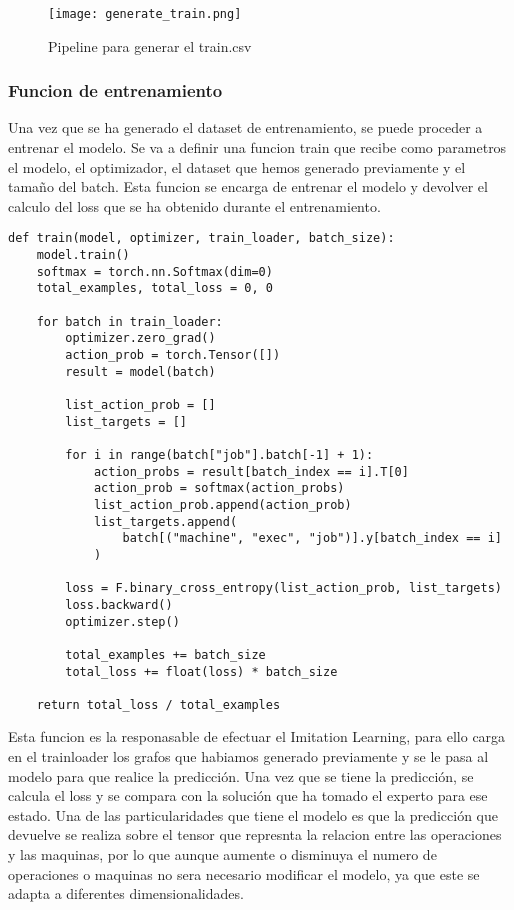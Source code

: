\begin{figure}[ht]
    \centering
    \texttt{[image: generate\_train.png]}
    \caption{Pipeline para generar el train.csv}
    \label{fig:trainingpipeline}
\end{figure}

\subsubsection{Funcion de entrenamiento}
Una vez que se ha generado el dataset de entrenamiento, se puede proceder a entrenar el modelo.
Se va a definir una funcion train que recibe como parametros el modelo, el optimizador, el dataset
que hemos generado previamente y el tamaño del batch. Esta funcion se encarga de entrenar el modelo
y devolver el calculo del loss que se ha obtenido durante el entrenamiento.\medskip

\begin{lstlisting}
def train(model, optimizer, train_loader, batch_size):
    model.train()
    softmax = torch.nn.Softmax(dim=0)
    total_examples, total_loss = 0, 0

    for batch in train_loader:
        optimizer.zero_grad()
        action_prob = torch.Tensor([])
        result = model(batch)

        list_action_prob = []
        list_targets = []

        for i in range(batch["job"].batch[-1] + 1):
            action_probs = result[batch_index == i].T[0]
            action_prob = softmax(action_probs)
            list_action_prob.append(action_prob)
            list_targets.append(
                batch[("machine", "exec", "job")].y[batch_index == i]
            )

        loss = F.binary_cross_entropy(list_action_prob, list_targets)
        loss.backward()
        optimizer.step()

        total_examples += batch_size
        total_loss += float(loss) * batch_size

    return total_loss / total_examples 
\end{lstlisting}\medskip

Esta funcion es la responasable de efectuar el Imitation Learning, para ello carga en el
trainloader los grafos que habiamos generado previamente y se le pasa al modelo para que
realice la predicción. Una vez que se tiene la predicción, se calcula el loss y se compara
con la solución que ha tomado el experto para ese estado. Una de las particularidades que
tiene el modelo es que la predicción que devuelve se realiza sobre el tensor que represnta 
la relacion entre las operaciones y las maquinas, por lo que aunque aumente o disminuya 
el numero de operaciones o maquinas no sera necesario modificar el modelo, ya que este 
se adapta a diferentes dimensionalidades.

